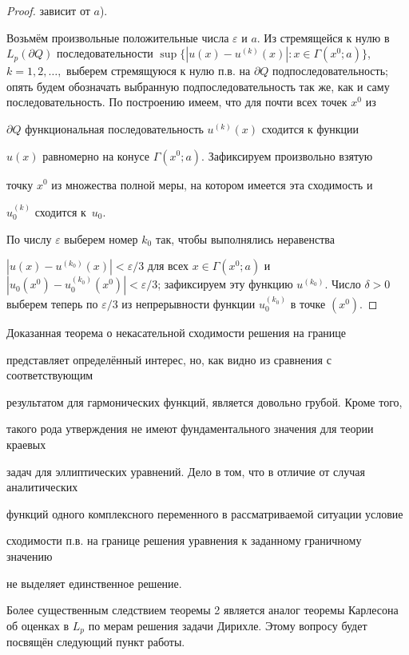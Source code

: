 \begin{proof}
зависит от $a$). 



Возьмём произвольные положительные числа $\varepsilon$ и $a$. Из стремящейся к нулю в $L_p(\partial Q)$ последовательности $\sup\{ |u(x) - u^{(k)}(x)|: x \in \Gamma(x^0; a)\}$, $k = 1, 2, \ldots,$ выберем стремящуюся к нулю п.в. на $\partial Q$ подпоследовательность; опять будем обозначать выбранную подпоследовательность так же, как и саму последовательность. По построению имеем, что для почти всех точек $x^0$ из

$\partial Q$ функциональная последовательность $u^{(k)}(x)$ сходится к функции

$u(x)$ равномерно на конусе $\Gamma(x^0; a)$. Зафиксируем произвольно взятую

точку $x^0$ из множества полной меры, на котором имеется эта сходимость и

$u_0^{(k)}$ сходится к~$u_0$.

По числу $\varepsilon$ выберем номер $k_0$ так, чтобы выполнялись неравенства

$|u(x) - u^{(k_0)}(x)| < \varepsilon /3$ для всех $x \in \Gamma(x^0; a)$ и $|u_0(x^0) - u_0^{(k_0)}(x^0)| < \varepsilon /3$; зафиксируем эту функцию $u^{(k_0)}$. Число $\delta > 0$ выберем теперь по $\varepsilon /3$ из непрерывности функции $u_0^{(k_0)}$ в точке $(x^0)$.\end{proof}



\smallskip



Доказанная теорема о некасательной сходимости решения на границе

представляет определённый интерес, но, как видно из сравнения с соответствующим

результатом для гармонических функций, является довольно грубой. Кроме того,

такого рода утверждения не имеют фундаментального значения для теории краевых

задач для эллиптических уравнений. Дело в том, что в отличие от случая аналитических

функций одного комплексного переменного в рассматриваемой ситуации условие

сходимости п.в. на границе решения уравнения к заданному граничному значению

не выделяет единственное решение.



Более существенным следствием теоремы 2 является аналог теоремы Карлесона об оценках в $L_p$ по мерам решения задачи Дирихле. Этому вопросу будет посвящён следующий пункт работы.

